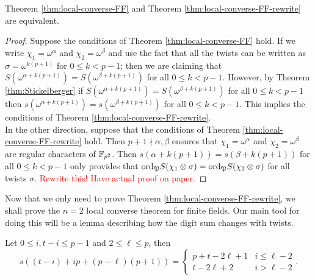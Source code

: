 \begin{prop}
Theorem \ref{thm:local-converse-FF} and Theorem \ref{thm:local-converse-FF-rewrite} are equivalent.
\end{prop}

\begin{proof}
Suppose the conditions of Theorem \ref{thm:local-converse-FF} hold. 
If we write $\chi_1 = \omega^\alpha$ and $\chi_2 = \omega^\beta$ and use the fact that all the twists can be written as $\sigma = \omega^{k (p+1)}$ for $0 \leq k < p-1$; then we are claiming that $S(\omega^{\alpha + k(p+1)}) = S(\omega^{\beta+k(p+1)})$ for all $0 \leq k < p-1$. 
However, by Theorem \ref{thm:Stickelberger} if $S(\omega^{\alpha + k(p+1)}) = S(\omega^{\beta+k(p+1)})$ for all $0 \leq k < p-1$ then $s(\omega^{\alpha + k(p+1)}) = s(\omega^{\beta+k(p+1)})$ for all $0 \leq k < p-1$. 
This implies the conditions of Theorem \ref{thm:local-converse-FF-rewrite}.
\\

In the other direction, suppose that the conditions of Theorem \ref{thm:local-converse-FF-rewrite} hold. 
Then $p+1 \nmid \alpha, \beta$ ensures that $\chi_1 = \omega^\alpha$ and $\chi_2 = \omega^\beta$ are regular characters of $\mathbb{F}_{p^2}$. Then $s(\alpha + k(p+1)) = s(\beta + k(p+1))$ for all $0 \leq k < p-1$ only provides that $\textrm{ord}_{\mathfrak{P}} S(\chi_1 \otimes \sigma) = \textrm{ord}_{\mathfrak{P}} S(\chi_2 \otimes \sigma)$ for all twists $\sigma$. \textcolor{red}{Rewrite this! Have actual proof on paper.}

\end{proof}

Now that we only need to prove Theorem \ref{thm:local-converse-FF-rewrite}, we shall prove the $n=2$ local converse theorem for finite fields.
Our main tool for doing this will be a lemma describing how the digit sum changes with twists.

\begin{lemma}
  \label{lem:digit-sum-twist}
  Let $0 \leq i, t-i \leq p-1$ and $2 \leq \ell \leq p$, then 
  \[ s((t-i)+ip+(p-\ell)(p+1)) = \begin{cases} p + t-2\ell+1 & i \leq \ell - 2 \\ t - 2 \ell + 2 & i > \ell -2\end{cases}.\]
\end{lemma}

